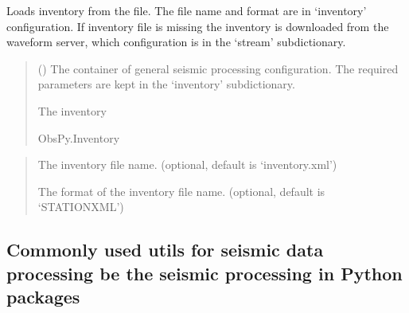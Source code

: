 \documentclass[letterpaper,10pt,english]{sphinxmanual}
\begin{document}

\begin{fulllineitems}
\label{\detokenize{api_core:amw.core.signal_utils.load_inventory}}
\pysigstartsignatures
{}
\pysigstopsignatures
\sphinxAtStartPar
Loads inventory from the file. The file name and format are in ‘inventory’ configuration.
If inventory file is missing the inventory is downloaded from the waveform server,
which configuration is in the ‘stream’ sub\sphinxhyphen{}dictionary.
\begin{quote}\begin{description}
\sphinxAtStartPar
{} () \textendash{} The container of general seismic processing configuration.
The required parameters are kept in the ‘inventory’ sub\sphinxhyphen{}dictionary.

\sphinxAtStartPar
The inventory

\sphinxAtStartPar
ObsPy.Inventory

\end{description}\end{quote}

\sphinxAtStartPar
{}
\begin{quote}\begin{description}
\sphinxAtStartPar
The inventory file name. (optional, default is ‘inventory.xml’)

\sphinxAtStartPar
The format of the inventory file name. (optional, default is ‘STATIONXML’)

\end{description}\end{quote}

\end{fulllineitems}


\subsection{Commonly used utils for seismic data processing be the seismic processing in Python packages}
\label{\detokenize{api_core:commonly-used-utils-for-seismic-data-processing-be-the-seismic-processing-in-python-packages}}\label{\detokenize{api_core:module-amw.core.utils}}
\end{document}
